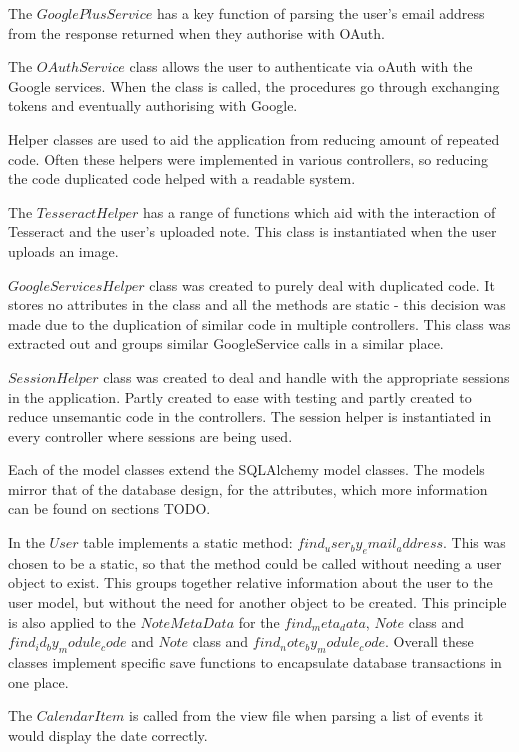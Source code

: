 The $GooglePlusService$ has a key function of parsing the user's email address from the response returned when they authorise with OAuth.

The $OAuthService$ class allows the user to authenticate via oAuth with the Google services. When the class is called, the procedures go through exchanging tokens and eventually authorising with Google.

Helper classes are used to aid the application from reducing amount of repeated code. Often these helpers were implemented in various controllers, so reducing the code duplicated code helped with a readable system.

The $TesseractHelper$ has a range of functions which aid with the interaction of Tesseract and the user's uploaded note. This class is instantiated when the user uploads an image.

$GoogleServicesHelper$ class was created to purely deal with duplicated code. It stores no attributes in the class and all the methods are static - this decision was made due to the duplication of similar code in multiple controllers. This class was extracted out and groups similar GoogleService calls in a similar place.

$SessionHelper$ class was created to deal and handle with the appropriate sessions in the application. Partly created to ease with testing and partly created to reduce unsemantic code in the controllers. The session helper is instantiated in every controller where sessions are being used.


Each of the model classes extend the SQLAlchemy model classes. The models mirror that of the database design, for the attributes, which more information can be found on sections TODO.

In the $User$ table implements a static method: $find_user_by_email_address$. This was chosen to be a static, so that the method could be called without needing a user object to exist. This groups together relative information about the user to the user model, but without the need for another object to be created. This principle is also applied to the $NoteMetaData$ for the $find_meta_data$, $Note$ class and $find_id_by_module_code$ and $Note$ class and $find_note_by_module_code$. Overall these classes implement specific save functions to encapsulate database transactions in one place.

The $CalendarItem$ is called from the view file when parsing a list of events it would display the date correctly.

